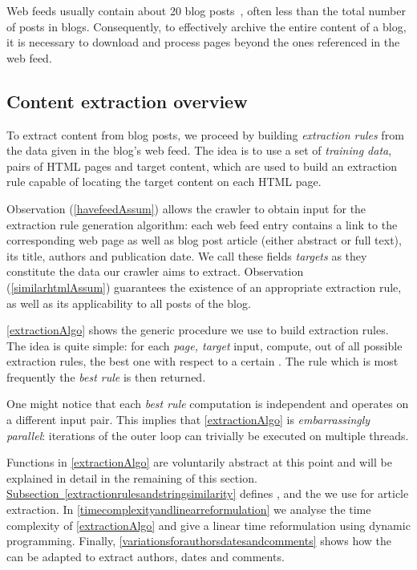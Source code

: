 Web feeds usually contain about 20 blog posts~\cite{oita2010}, 
often less than the total number of posts in blogs. Consequently, to 
effectively archive the entire content of a blog, it is necessary to 
download and process pages beyond the ones referenced in the web feed.

\subsection{Content extraction overview}
\label{contentextraction}

To extract content from blog posts, we proceed by building 
\emph{extraction rules} from the data given in the blog's web feed. 
The idea is to use a set of \emph{training data}, pairs of HTML pages 
and target content, which are used to build an extraction rule capable 
of locating the target content on each HTML page.

Observation (\ref{havefeedAssum}) allows the crawler to obtain input for 
the extraction rule generation algorithm: each web feed entry contains a 
link to the corresponding web page as well as blog post article (either 
abstract or full text), its title, authors and publication date. We call 
these fields \emph{targets} as they constitute the data our crawler aims 
to extract. Observation (\ref{similarhtmlAssum}) guarantees the existence 
of an appropriate extraction rule, as well as its applicability to all 
posts of the blog.

\autoref{extractionAlgo} shows the generic procedure we use to build 
extraction rules. The idea is quite simple: for each \code{(}\emph{page, 
target}\code{)} input, compute, out of all possible extraction rules, 
the best one with respect to a certain . The rule 
which is most frequently the \emph{best rule} is then returned.

\extractionAlgo

One might notice that each \emph{best rule} computation is 
independent and operates on a different input pair. This implies that 
\autoref{extractionAlgo} is \emph{embarrassingly parallel}: iterations 
of the outer loop can trivially be executed on multiple threads.

Functions in \autoref{extractionAlgo} are voluntarily abstract at this 
point and will be explained in detail in the remaining of this section.
\hyperref[extractionrulesandstringsimilarity]{Subsection~\ref*{extractionrulesandstringsimilarity}} %
defines ,  and the  we use 
for article extraction. In \autoref{timecomplexityandlinearreformulation} 
we analyse the time complexity of \autoref{extractionAlgo} and give a 
linear time reformulation using dynamic programming. Finally, 
\autoref{variationsforauthorsdatesandcomments} shows how the 
 can be adapted to extract authors, dates and 
comments.


